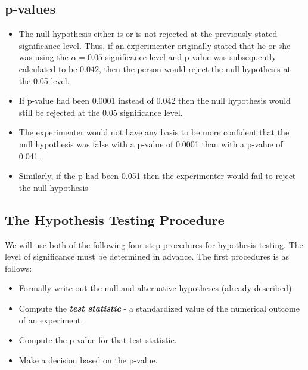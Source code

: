 \documentclass[]{report}
\begin{document}
	\subsection{p-values}
	
	\begin{itemize}
		\item The null hypothesis either is or is not rejected at the previously stated significance level. Thus, if an experimenter originally stated that he or she was using the $\alpha = 0.05$ significance level and p-value was subsequently calculated to be $0.042$, then the person would reject the null hypothesis at the 0.05 level. \item If p-value had been 0.0001 instead of 0.042 then the null hypothesis would still be rejected at the 0.05 significance level.  \item
		The experimenter would not have any basis to be more confident that the null hypothesis was false with a p-value of 0.0001 than with a p-value of 0.041. \item Similarly, if the p had been 0.051 then the experimenter would fail to reject the null hypothesis
	\end{itemize}
	
	
	
	
	
	\subsection{The Hypothesis Testing Procedure }
	We will use both of the following four step procedures for hypothesis testing. The level of significance must be determined in advance. The first procedures is as follows:
	
	\begin{itemize}
		\item Formally write out the null and alternative hypotheses (already described).
		\item Compute the \emph{\textbf{test statistic}} - a standardized value of the numerical outcome of an experiment.
		\item Compute the p-value for that test statistic.
		\item Make a decision based on the p-value.
	\end{itemize}
	
	
	
	
\end{document}
